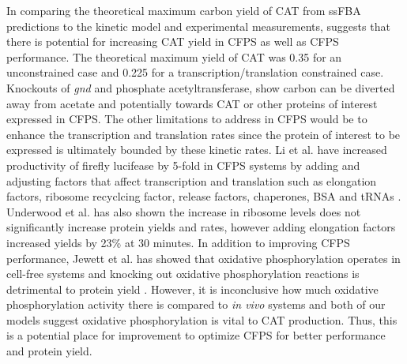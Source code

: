 \documentclass[12pt]{article}
\begin{document}
In comparing the theoretical maximum carbon yield of CAT from ssFBA predictions to the kinetic model and experimental measurements, suggests that there is potential for increasing CAT yield in CFPS as well as CFPS performance. 
The theoretical maximum yield of CAT was 0.35 for an unconstrained case and 0.225 for a transcription/translation constrained case. 
Knockouts of \textit{gnd} and phosphate acetyltransferase, show carbon can be diverted away from acetate and potentially towards CAT or other proteins of interest expressed in CFPS. 
The other limitations to address in CFPS would be to enhance the transcription and translation rates since the protein of interest to be expressed is ultimately bounded by these kinetic rates.    
Li et al. have increased productivity of firefly lucifease by 5-fold in CFPS systems by adding and adjusting factors that affect transcription and translation such as elongation factors, ribosome recyclcing factor, release factors, chaperones, BSA and tRNAs \cite{2014_li_PlosOne}. 
Underwood et al. has also shown the increase in ribosome levels does not significantly increase protein yields and rates, however adding elongation factors increased yields by 23\% at 30 minutes\cite{2005_underwood_biotech}.
In addition to improving CFPS performance, Jewett et al. has showed that oxidative phosphorylation operates in cell-free systems and knocking out oxidative phosphorylation reactions is detrimental to protein yield \cite{2008_jewett_molsysbiol}. 
However, it is inconclusive how much oxidative phosphorylation activity there is compared to \textit{in vivo} systems and both of our models suggest oxidative phosphorylation is vital to CAT production. 
Thus, this is a potential place for improvement to optimize CFPS for better performance and protein yield.   

\end{document}
